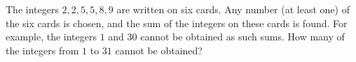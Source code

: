 The integers $2,2,5,5,8,9$ are written on six cards. Any number (at least one) of the six cards is chosen, and the sum of the integers on these cards is found. For example, the integers $1$ and $30$ cannot be obtained as such sums. How many of the integers from $1$ to $31$ cannot be obtained?
